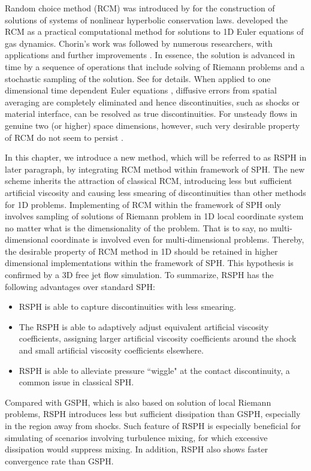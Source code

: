 Random choice method (RCM) was introduced by \citet{glimm1965solutions} for the construction of solutions of systems of nonlinear hyperbolic conservation laws. \citet{chorin1976random} developed the RCM as a practical computational method for solutions to 1D Euler equations of gas dynamics. Chorin's work was followed by numerous researchers, with applications and further improvements \citep{sod1977numerical, concus1979numerical,colella1982glimm, freistuhler1992numerical}. In essence, the solution is advanced in time by a sequence of operations that include solving of Riemann problems and a stochastic sampling of the solution. See \citep{toro2013riemann} for details. When applied to one dimensional time dependent Euler equations \citep{colella1982glimm}, diffusive errors from spatial averaging are completely eliminated and hence discontinuities, such as shocks or material interface, can be resolved as true discontinuities.
For unsteady flows in genuine two (or higher) space dimensions, however, such very desirable property of RCM do not seem to persist \citep{colella1982glimm}.

In this chapter, we introduce a new method, which will be referred to as RSPH in later paragraph, by integrating RCM method within framework of SPH. 
The new scheme inherits the attraction of classical RCM, introducing less but sufficient artificial viscosity and causing less smearing of discontinuities than other methods for 1D problems. Implementing of RCM within the framework of SPH only involves sampling of solutions of Riemann problem in 1D local coordinate system no matter what is the dimensionality of the problem. That is to say, no multi-dimensional coordinate is involved even for multi-dimensional problems. Thereby, the desirable property of RCM method in 1D should be retained in higher dimensional implementations within the framework of SPH. This hypothesis is confirmed by a 3D free jet flow simulation. 
To summarize, RSPH has the following advantages over standard SPH:
\begin{itemize}
\item RSPH is able to capture discontinuities with less smearing.
\item The RSPH is able to adaptively adjust equivalent artificial viscosity coefficients, assigning larger artificial viscosity coefficients around the shock and small artificial viscosity coefficients elsewhere.
\item RSPH is able to alleviate pressure ``wiggle" at the contact discontinuity, a common issue in classical SPH.
\end{itemize}
Compared with GSPH, which is also based on solution of local Riemann problems, RSPH introduces less but sufficient dissipation than GSPH, especially in the region away from shocks. Such feature of RSPH is especially beneficial for simulating of scenarios involving turbulence mixing, for which excessive dissipation would suppress mixing. In addition, RSPH also shows faster convergence rate than GSPH.

